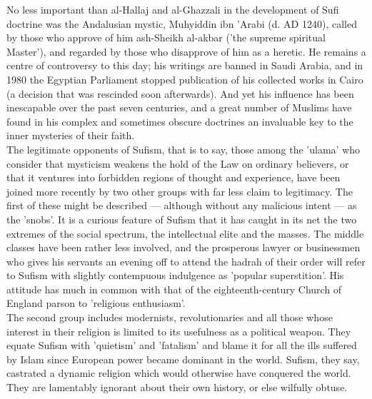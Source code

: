 \documentclass[11pt, b5paper, twoside]{book}
\begin{document}
No less important than al-Hallaj and al-Ghazzali in the development of Sufi doctrine was the 
Andalusian mystic, Muhyiddin ibn 'Arabi (d. AD 1240), called by those who approve of him ash-Sheikh 
al-akbar ('the supreme spiritual Master'), and regarded by those who disapprove of him as a heretic. 
He remains a centre of controversy to this day; his writings are banned in Saudi Arabia, and in 1980 
the Egyptian Parliament stopped publication of his collected works in Cairo (a decision that was 
rescinded soon afterwards). And yet his influence has been inescapable over the past seven centuries, 
and a great number of Muslims have found in his complex and sometimes obscure doctrines an invaluable 
key to the inner mysteries of their faith. \\

The legitimate opponents of Sufism, that is to say, those among the 'ulama' who consider that 
mysticism weakens the hold of the Law on ordinary believers, or that it ventures into forbidden 
regions of thought and experience, have been joined more recently by two other groups with far less 
claim to legitimacy. The first of these might be described --- although without any malicious intent --- 
as the 'snobs'. It is a curious feature of Sufism that it has caught in its net the two extremes of 
the social spectrum, the intellectual elite and the masses. The middle classes have been rather less 
involved, and the prosperous lawyer or businessmen who gives his servants an evening off to attend 
the hadrah of their order will refer to Sufism with slightly contempuous indulgence as 'popular 
superstition'. His attitude has much in common with that of the eighteenth-century Church of England 
parson to 'religious enthusiasm'. \\

The second group includes modernists, revolutionaries and all those whose interest in their religion 
is limited to its usefulness as a political weapon. They equate Sufism with 'quietism' and 'fatalism' 
and blame it for all the ills suffered by Islam since European power became dominant in the world. 
Sufism, they say, castrated a dynamic religion which would otherwise have conquered the world. They 
are lamentably ignorant about their own history, or else wilfully obtuse. \\
\end{document}
